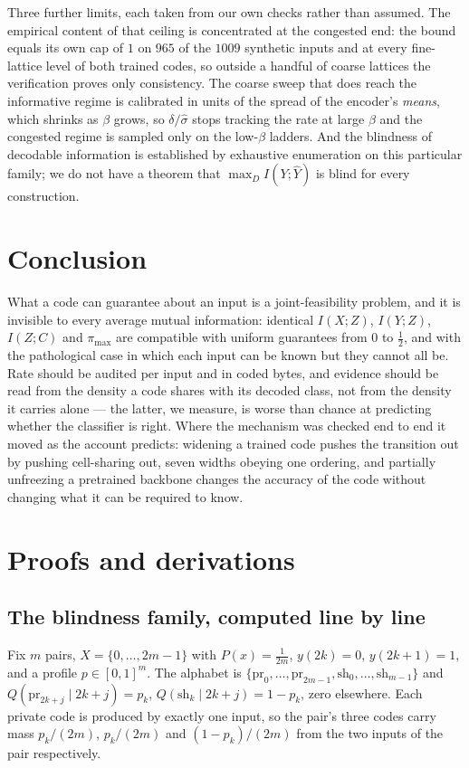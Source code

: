 \documentclass[11pt]{article}
\begin{document}
Three further limits, each taken from our own checks rather than assumed. The empirical content of
that ceiling is concentrated at the congested end: the bound equals its own cap of $1$ on
$965$ of the $1009$ synthetic inputs and at every fine-lattice level of both trained codes, so
outside a handful of coarse lattices the verification proves only consistency. The coarse sweep
that does reach the informative regime is calibrated in units of the spread of the encoder's
\emph{means}, which shrinks as $\beta$ grows, so $\delta/\hat\sigma$ stops tracking the rate at
large $\beta$ and the congested regime is sampled only on the low-$\beta$ ladders. And the blindness
of decodable information is established by exhaustive enumeration on this particular family; we do
not have a theorem that $\max_D I(Y;\hat Y)$ is blind for every construction.

\section{Conclusion}
What a code can guarantee about an input is a joint-feasibility problem, and it is invisible to
every average mutual information: identical $I(X;Z)$, $I(Y;Z)$, $I(Z;C)$ and $\pi_{\max}$ are
compatible with uniform guarantees from $0$ to $\tfrac12$, and with the pathological case in which
each input can be known but they cannot all be. Rate should be audited per input and in coded
bytes, and evidence should be read from the density a code shares with its decoded class, not from
the density it carries alone --- the latter, we measure, is worse than chance at predicting
whether the classifier is right. Where the mechanism was checked end to end it moved as the account
predicts: widening a trained code pushes the transition out by pushing cell-sharing out, seven
widths obeying one ordering, and partially unfreezing a pretrained backbone changes the accuracy of
the code without changing what it can be required to know.


\appendix
\section{Proofs and derivations}
\subsection{The blindness family, computed line by line}
Fix $m$ pairs, $X=\{0,\dots,2m-1\}$ with $P(x)=\frac1{2m}$, $y(2k)=0$, $y(2k+1)=1$, and a profile
$p\in[0,1]^m$. The alphabet is $\{\mathrm{pr}_{0},\dots,\mathrm{pr}_{2m-1},\mathrm{sh}_{0},\dots,
\mathrm{sh}_{m-1}\}$ and
$Q(\mathrm{pr}_{2k+j}\mid 2k+j)=p_k$, $Q(\mathrm{sh}_k\mid 2k+j)=1-p_k$, zero elsewhere.
Each private code is produced by exactly one input, so the pair's three codes carry mass
$p_k/(2m)$, $p_k/(2m)$ and $(1-p_k)/(2m)$ from the two inputs of the pair respectively.
\end{document}

